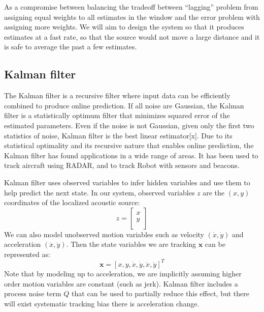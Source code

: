 As a compromise between balancing the tradeoff between ``lagging'' problem from assigning equal weights to all estimates in the window and the error problem with assigning more weights. We will aim to design the system so that it produces estimates at a fast rate, so that the source would not move a large distance and it is safe to average the past a few estimates.

\subsection{Kalman filter}
The Kalman filter is a recursive filter where input data can be efficiently combined to produce online prediction. If all noise are Gaussian, the Kalman filter is a statistically optimum filter that minimizes squared error of the estimated parameters. Even if the noise is not Gaussian, given only the first two statistics of noise, Kalman filter is the best linear estimator[x]. Due to its statistical optimality and its recursive nature that enables online prediction, the Kalman filter has found applications in a wide range of areas. It has been used to track aircraft using RADAR, and to track Robot with sensors and beacons.

Kalman filter uses observed variables to infer hidden variables and use them to help predict the next state. In our system, observed variables $z$ are the $(x,y)$ coordinates of the localized acoustic source:
\[
z = \left[\begin{array}{c}
x\\
y\\
\end{array}\right]
\]
We can also model unobserved motion variables such as velocity $(\dot{x}, \dot{y})$ and acceleration $(\ddot{x}, \ddot{y})$. Then the state variables we are tracking $\mathbf{x}$ can be represented as:
\[
\mathbf{x} = \left[x, y, \dot{x}, \dot{y}, \ddot{x}, \ddot{y}\right]^T
\]
Note that by modeling up to acceleration, we are implicitly assuming higher order motion variables are constant (such as jerk). Kalman filter includes a process noise term $Q$ that can be used to partially reduce this effect, but there will exist systematic tracking bias there is acceleration change.

